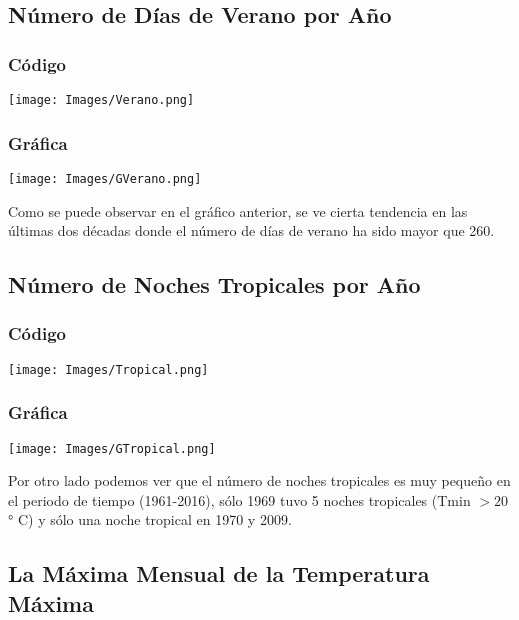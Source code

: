 \documentclass{article}
\begin{document}
\subsection{Número de Días de Verano por Año}

\subsubsection{Código}

\begin{center}
    \texttt{[image: Images/Verano.png]}
\end{center}
\subsubsection{Gráfica}
\begin{center}
    \texttt{[image: Images/GVerano.png]}
\end{center}
Como se puede observar en el gráfico anterior, se ve cierta tendencia en las últimas dos décadas donde el número de días de verano ha sido mayor que 260.

\subsection{Número de Noches Tropicales por Año}

\subsubsection{Código}

\begin{center}
    \texttt{[image: Images/Tropical.png]}
\end{center}
\subsubsection{Gráfica}
\begin{center}
    \texttt{[image: Images/GTropical.png]}
\end{center}
Por otro lado podemos ver que el número de noches tropicales es muy pequeño en el periodo de tiempo (1961-2016), sólo 1969 tuvo 5 noches tropicales (Tmin $> 20$ ° C) y sólo una noche tropical en 1970 y 2009.

\subsection{La Máxima Mensual de la Temperatura Máxima}
\end{document}
